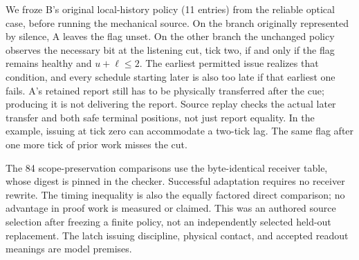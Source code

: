 \documentclass[11pt]{article}
\begin{document}
We froze B's original local-history policy (11 entries) from the
reliable optical case, before running the mechanical source.
On the branch originally represented by silence, A leaves the flag
unset. On the other branch the unchanged policy observes the necessary
bit at the listening cut, tick two, if and only if the flag remains
healthy and \(u+\ell\leq 2\). The earliest permitted issue realizes
that condition, and every schedule starting later is also too late
if that earliest one fails. A's retained report still has to be
physically transferred after the cue; producing it is not delivering
the report. Source replay checks the actual later transfer and
both safe terminal positions, not just report equality. In the
example, issuing at tick zero can accommodate a two-tick lag.
The same flag after one more tick of prior work misses the cut.

The 84 scope-preservation comparisons use the byte-identical
receiver table, whose digest is pinned in the checker. Successful
adaptation requires no receiver rewrite. The timing inequality is
also the equally factored direct comparison; no advantage in proof
work is measured or claimed. This was an authored source selection
after freezing a finite policy, not an independently selected
held-out replacement. The latch issuing discipline, physical
contact, and accepted readout meanings are model premises.
\end{document}
